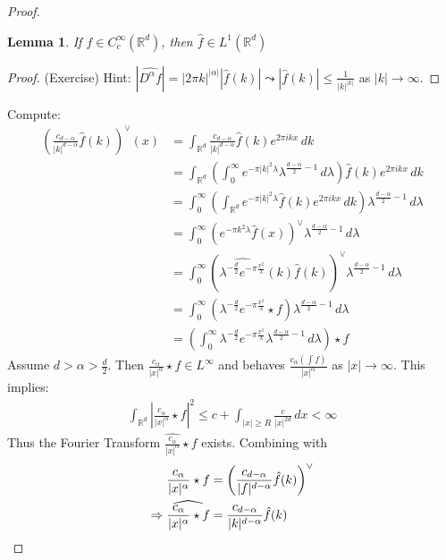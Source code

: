 \documentclass{report}
\theoremstyle{tommy}
\newtheorem{lem}[defn]{Lemma}
\newcommand{\Rd}{\mathbb{R}^d}
\begin{document}
\begin{proof}
    \begin{lem}
      If \(f \in C_c^\infty(\Rd)\), then \(\hat f \in L^1(\mathbb{R}^d)\)
    \end{lem}

    \begin{proof}(Exercise)
      Hint: \(|\widehat{D^\alpha f}| = |2 \pi k|^{|\alpha|} |\hat f(k)| \leadsto |\hat f(k)| \le \frac{1}{|k|^{|k|}}\) as \(|k| \to \infty\).
    \end{proof}

    Compute:
    \begin{align*}
      \left(\frac{c_{d-\alpha}}{|k|^{d-\alpha}} \hat f(k)\right)^\lor (x) 
      &= \int_{\Rd} \frac{c_{d-\alpha}}{|k|^{d-\alpha}} \hat f(k) e^{2 \pi i k x} \, dk \\
      &= \int_{\Rd} \left(\int_0^\infty e^{-\pi |k|^2 \lambda} \lambda^{\frac{d-\alpha}{2}-1} \, d \lambda \right) \hat f (k) e^{2 \pi i k x} \, dk \\
      &= \int_0^\infty \left(\int_{\Rd} e^{-\pi |k|^2 \lambda} \hat f (k) e^{2 \pi i k x} \, dk \right) \lambda^{\frac{d-\alpha}{2}-1} \, d \lambda \\
      &= \int_0^\infty \left(e^{- \pi k^2 \lambda} \hat f(x)\right)^\lor \lambda^{\frac{d-\alpha}{2} - 1} \, d \lambda \\
      &= \int_0^\infty \left(\widehat{\lambda^{-\frac{d}{2}} e^{- \pi \frac{x^2}{\lambda}}}(k) \hat f(k)\right)^\lor \lambda^{\frac{d-\alpha}{2} - 1} \, d \lambda \\
      &= \int_0^\infty \left(\lambda^{- \frac{d}{2}} e^{- \pi \frac{x^2}{\lambda}} \star f \right) \lambda^{\frac{d-\alpha}{2} - 1} \, d \lambda \\
      &= \left(\int_0^\infty \lambda^{- \frac{d}{2}} e^{- \pi \frac{x^2}{\lambda}}\lambda^{\frac{d-\alpha}{2} - 1} \, d \lambda \right) \star f
    \end{align*}
    Assume \(d > \alpha > \frac{d}{2}\). Then \(\frac{c_\alpha}{|x|^\alpha} \star f \in L^\infty\) and behaves \(\frac{c_\alpha(\int f)}{|x|^\alpha}\) as \(|x| \to \infty\). This implies:
    \begin{align*}
      \int_{\mathbb{R}^d} \left| \frac{c_\alpha}{|x|^\alpha} \star f \right|^2 \le c + \int_{|x| \ge R} \frac{c}{|x|^{2d}} \, dx < \infty 
    \end{align*}
    Thus the Fourier Transform \(\widehat{\frac{c_\alpha}{|x|^\alpha}} \star f\) exists. Combining with 
    \begin{align*}
      \frac{c_\alpha}{|x|^\alpha} \star f &= \left(\frac{c_{d-\alpha}}{|f|^{d-\alpha}} \hat f(k) \right)^\lor \\
      \Rightarrow \widehat{\frac{c_\alpha}{|x|^\alpha} \star f} &= \frac{c_{d-\alpha}}{|k|^{d-\alpha}} \hat f (k) \qedhere
    \end{align*}
  \end{proof}
\end{document}
